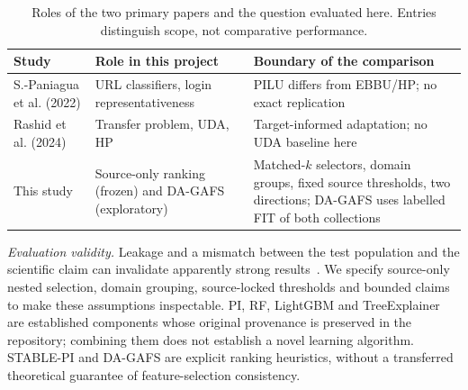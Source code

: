 \begin{table}[t]
\caption{Roles of the two primary papers and the question evaluated here. Entries distinguish scope, not comparative performance.}
\label{tab:positioning}
\centering\scriptsize
\setlength{\tabcolsep}{3pt}
\begin{tabular}{>{\raggedright\arraybackslash}p{}>{\raggedright\arraybackslash}p{}>{\raggedright\arraybackslash}p{}}
\toprule
Study & Role in this project & Boundary of the comparison \\
\midrule
S.-Paniagua et al. (2022) & URL classifiers, login representativeness & PILU differs from EBBU/HP; no exact replication \\
Rashid et al. (2024) & Transfer problem, UDA, HP & Target-informed adaptation; no UDA baseline here \\
This study & Source-only ranking (frozen) and DA-GAFS (exploratory) & Matched-$k$ selectors, domain groups, fixed source thresholds, two directions; DA-GAFS uses labelled FIT of both collections \\
\bottomrule
\end{tabular}
\end{table}

\textit{Evaluation validity.} Leakage and a mismatch between the test population and the scientific claim can invalidate apparently strong results~\cite{kapoor2023}. We specify source-only nested selection, domain grouping, source-locked thresholds and bounded claims to make these assumptions inspectable. PI, RF, LightGBM and TreeExplainer are established components whose original provenance is preserved in the repository; combining them does not establish a novel learning algorithm. STABLE-PI and DA-GAFS are explicit ranking heuristics, without a transferred theoretical guarantee of feature-selection consistency.
